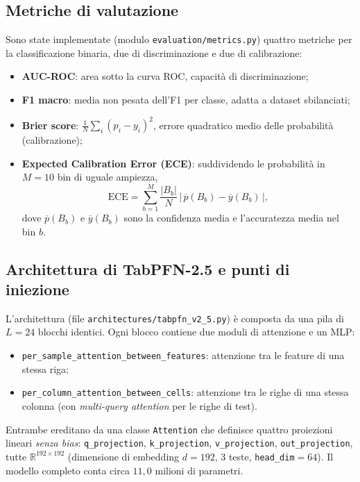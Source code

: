 \documentclass[11pt,a4paper]{article}
\begin{document}
\subsection{Metriche di valutazione}
Sono state implementate (modulo \texttt{evaluation/metrics.py}) quattro metriche
per la classificazione binaria, due di discriminazione e due di calibrazione:
\begin{itemize}[nosep]
  \item \textbf{AUC-ROC}: area sotto la curva ROC, capacità di discriminazione;
  \item \textbf{F1 macro}: media non pesata dell'F1 per classe, adatta a dataset
  sbilanciati;
  \item \textbf{Brier score}: $\frac{1}{N}\sum_i (p_i - y_i)^2$, errore quadratico
  medio delle probabilità (calibrazione);
  \item \textbf{Expected Calibration Error (ECE)}: suddividendo le probabilità in
  $M=10$ bin di uguale ampiezza,
  \begin{equation}
    \mathrm{ECE} = \sum_{b=1}^{M} \frac{|B_b|}{N}\,
    \bigl|\,\overline{p}(B_b) - \overline{y}(B_b)\,\bigr|,
  \end{equation}
  dove $\overline{p}(B_b)$ e $\overline{y}(B_b)$ sono la confidenza media e
  l'accuratezza media nel bin $b$.
\end{itemize}

\subsection{Architettura di TabPFN-2.5 e punti di iniezione}
\label{sec:arch}
L'architettura (file \texttt{architectures/tabpfn\_v2\_5.py}) è composta da una
pila di $L=24$ blocchi identici. Ogni blocco contiene due moduli di attenzione e
un MLP:
\begin{itemize}[nosep]
  \item \texttt{per\_sample\_attention\_between\_features}: attenzione tra le
  feature di una stessa riga;
  \item \texttt{per\_column\_attention\_between\_cells}: attenzione tra le righe
  di una stessa colonna (con \emph{multi-query attention} per le righe di test).
\end{itemize}
Entrambe ereditano da una classe \texttt{Attention} che definisce quattro
proiezioni lineari \emph{senza bias}: \texttt{q\_projection},
\texttt{k\_projection}, \texttt{v\_projection}, \texttt{out\_projection}, tutte
$\mathbb{R}^{192\times192}$ (dimensione di embedding $d=192$, $3$ teste,
\texttt{head\_dim}$=64$). Il modello completo conta circa $11{,}0$ milioni di
parametri.
\end{document}
